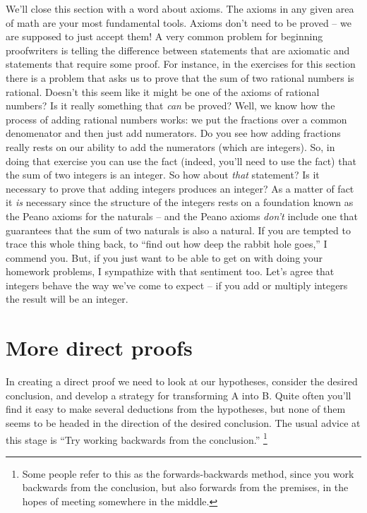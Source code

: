 We'll close this section with a word about axioms.  The axioms in any
given area of math are your most fundamental tools.  Axioms don't
need to be proved -- we are supposed to just accept them!  A very common 
problem for beginning proofwriters is telling the difference between statements
that are axiomatic and statements that require some proof.  For instance, in the
exercises for this section there is a problem that asks us to prove that the sum of
two rational numbers is rational.  Doesn't this seem like it might be one of
the axioms of rational numbers?  Is it really something that {\em can} be proved?
Well, we know how the process of adding rational numbers works: we put the
fractions over a common
denomenator and then just add numerators.  Do you see how adding fractions really rests
on our ability to add the numerators (which are integers).  So, in doing that exercise you
can use the fact (indeed, you'll need to use the fact) that the sum of two integers is an integer.
So how about {\em that} statement?  Is it necessary to prove that adding integers produces 
an integer?  As a matter of fact it {\em is} necessary since the structure of the integers 
rests on a foundation known as the Peano axioms for the naturals -- and the Peano axioms
{\em don't} include one that guarantees that the sum of two naturals is also a natural.  If you
are tempted to trace this whole thing back, to ``find out how deep the rabbit hole goes,'' I commend
you.   But, if you just want to be able to get on with doing your homework problems, I sympathize 
with that sentiment too.  Let's agree that integers behave the way we've come to expect -- if 
you add or multiply integers the result will be an integer. 

\newpage




\newpage
\section{More direct proofs}
\label{sec:more}

In creating a direct proof we need to look at our hypotheses, consider 
the desired conclusion, and develop a strategy for transforming A into B.
Quite often you'll find it easy to make several deductions from the 
hypotheses, but none of them seems to be headed in the direction of 
the desired conclusion.  The usual advice at this stage is 
``Try working backwards from the conclusion.''
\footnote{Some people refer to this as the forwards-backwards method, since %
you work backwards from the conclusion, but also forwards from the premises, %
in the hopes of meeting somewhere in the middle.}  

